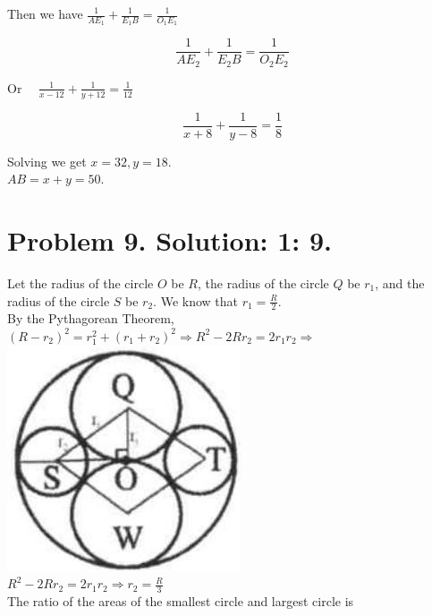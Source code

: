 \documentclass[10pt]{article}
\begin{document}
Then we have \(\frac{1}{A E_{1}}+\frac{1}{E_{1} B}=\frac{1}{O_{1} E_{1}}\)

\[
\frac{1}{A E_{2}}+\frac{1}{E_{2} B}=\frac{1}{O_{2} E_{2}}
\]

Or \(\quad \frac{1}{x-12}+\frac{1}{y+12}=\frac{1}{12}\)

\[
\frac{1}{x+8}+\frac{1}{y-8}=\frac{1}{8}
\]

Solving we get \(x=32, y=18\).\\
\(A B=x+y=50\).

\section*{Problem 9. Solution: 1: 9.}
Let the radius of the circle \(O\) be \(R\), the radius of the circle \(Q\) be \(r_{1}\), and the radius of the circle \(S\) be \(r_{2}\). We know that \(r_{1}=\frac{R}{2}\).\\
By the Pythagorean Theorem,\\
\(\left(R-r_{2}\right)^{2}=r_{1}^{2}+\left(r_{1}+r_{2}\right)^{2} \Rightarrow R^{2}-2 R r_{2}=2 r_{1} r_{2} \Rightarrow\)\\
\includegraphics[max width=\textwidth, center]{2025_04_17_97bc1f7e44d93c271a88g-190(1)}\\
\(R^{2}-2 R r_{2}=2 r_{1} r_{2} \Rightarrow r_{2}=\frac{R}{3}\)\\
The ratio of the areas of the smallest circle and largest circle is\\
\end{document}
